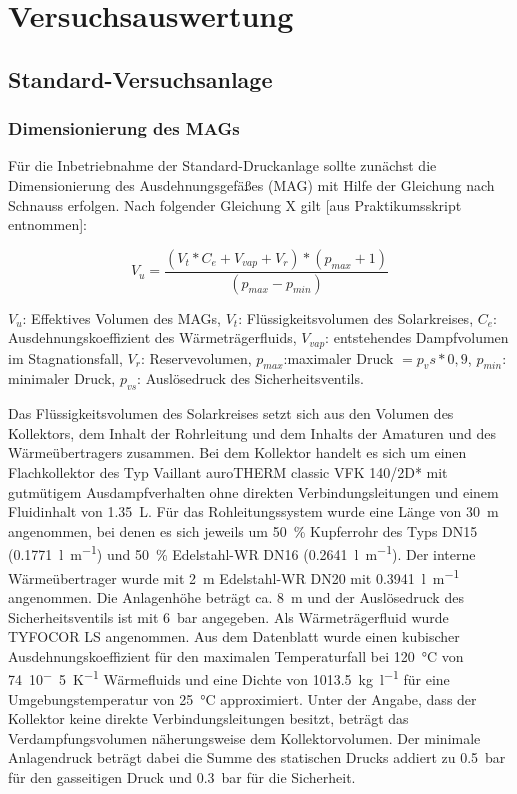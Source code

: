 \section{Versuchsauswertung}

\subsection{Standard-Versuchsanlage} 

\subsubsection{Dimensionierung des MAGs}
Für die Inbetriebnahme der Standard-Druckanlage sollte zunächst die Dimensionierung des Ausdehnungsgefäßes (MAG) mit Hilfe der Gleichung nach Schnauss erfolgen.  Nach folgender Gleichung X gilt [aus Praktikumsskript entnommen]: 

\begin{equation}
\label{eq:eff.VolMAG}
V_u= \frac{(V_t * C_e + V_{vap} + V_r)*(p_{max} + 1)}{(p_{max}-p_{min})}
\end{equation}

\begin{center}
	\begin{small}
		$V_u$: Effektives Volumen des MAGs,
		$V_t$: Flüssigkeitsvolumen des Solarkreises,
		$C_e$: Ausdehnungskoeffizient des Wärmeträgerfluids,
		$V_{vap}$: entstehendes Dampfvolumen im Stagnationsfall,
		$V_r$: Reservevolumen,
		$p_{max}$:maximaler Druck $=p_vs*0,9$,
		$p_{min}$: minimaler Druck,
		$p_{vs}$: Auslösedruck des Sicherheitsventils.
	\end{small}
\end{center}

Das Flüssigkeitsvolumen des Solarkreises setzt sich aus den Volumen des Kollektors, dem Inhalt der Rohrleitung und dem Inhalts der Amaturen und des Wärmeübertragers zusammen. Bei dem Kollektor handelt es sich um einen Flachkollektor des Typ Vaillant auroTHERM classic VFK 140/2D* mit gutmütigem Ausdampfverhalten ohne direkten Verbindungsleitungen und einem Fluidinhalt von \SI{1,35}{\liter}. Für das Rohleitungssystem wurde eine Länge von \SI{30}{\metre} angenommen, bei denen es sich jeweils um \SI{50}{\percent} Kupferrohr des Typs DN15 (\SI{0,1771}{\litre\per\metre}) und \SI{50}{\percent} Edelstahl-WR DN16 (\SI{0,2641}{\litre\per\metre}). Der interne Wärmeübertrager wurde mit \SI{2}{\metre} Edelstahl-WR DN20 mit \SI{0,3941}{\litre\per\metre} angenommen. Die Anlagenhöhe beträgt ca. \SI{8}{\metre} und der Auslösedruck des Sicherheitsventils ist mit \SI{6}{\bar} angegeben. Als Wärmeträgerfluid wurde TYFOCOR LS angenommen. Aus dem Datenblatt wurde einen kubischer Ausdehnungskoeffizient für den maximalen Temperaturfall bei \SI{120}{\celsius} von \SI{74}{10^-5\per\kelvin} Wärmefluids und eine Dichte von \SI{1013,5}{\kg\per\litre} für eine Umgebungstemperatur von \SI{25}{\celsius} approximiert. Unter der Angabe, dass der Kollektor keine direkte Verbindungsleitungen besitzt, beträgt das Verdampfungsvolumen näherungsweise dem Kollektorvolumen. Der minimale Anlagendruck beträgt dabei die Summe des statischen Drucks addiert zu \SI{0,5}{\bar} für den gasseitigen Druck und \SI{0,3}{\bar} für die Sicherheit. 

